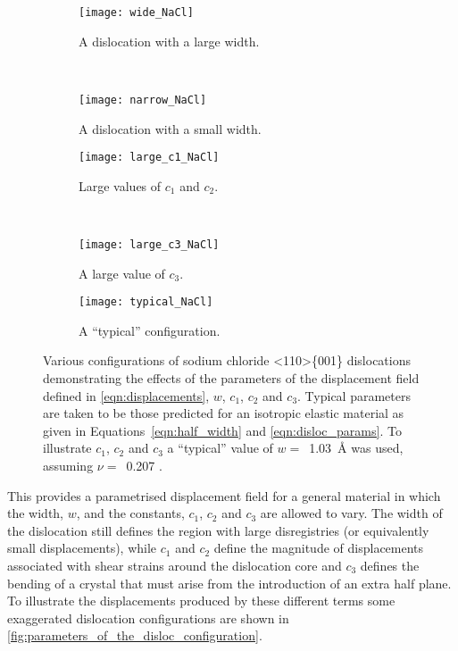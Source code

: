 \begin{figure}
\centering

    \begin{subfigure}{0.4\textwidth}
    \centering
    \texttt{[image: wide\_NaCl]}
    \caption{A dislocation with a large width.}
    \end{subfigure}
    ~
    \begin{subfigure}{0.4\textwidth}
    \centering
    \texttt{[image: narrow\_NaCl]}
    \caption{A dislocation with a small width.}
    \end{subfigure}

	\begin{subfigure}{0.4\textwidth}
	\centering
    \texttt{[image: large\_c1\_NaCl]}
    \caption{Large values of $c_1$ and $c_2$.}
	\end{subfigure}
    ~
	\begin{subfigure}{0.4\textwidth}
	\centering
    \texttt{[image: large\_c3\_NaCl]}
    \caption{A large value of $c_3$.}
	\end{subfigure}

    \begin{subfigure}{0.8\textwidth}
    \centering
    \texttt{[image: typical\_NaCl]}
    \caption{A ``typical'' configuration.}
    \end{subfigure}

\caption{Various configurations of sodium chloride <110>\{001\} dislocations demonstrating the effects of the parameters of the displacement field defined in \autoref{eqn:displacements}, $w$, $c_1$, $c_2$ and $c_3$. Typical parameters are taken to be those predicted for an isotropic elastic material as given in  Equations~\ref{eqn:half_width} and \ref{eqn:disloc_params}. To illustrate $c_1$, $c_2$ and $c_3$ a ``typical'' value of $w=$~\SI{1.03}{\angstrom} was used, assuming $\nu =$~\num{0.207} \cite{Theocaris1994}.\label{fig:parameters_of_the_disloc_configuration}}
\end{figure}


This provides a parametrised displacement field for a general material in which the width, $w$, and the constants, $c_1$, $c_2$ and $c_3$ are allowed to vary. The width of the dislocation still defines the region with large disregistries (or equivalently small displacements), while $c_1$ and $c_2$ define the magnitude of displacements associated with shear strains around the dislocation core and $c_3$ defines the bending of a crystal that must arise from the introduction of an extra half plane.
To illustrate the displacements produced by these different terms some exaggerated dislocation configurations are shown in \autoref{fig:parameters_of_the_disloc_configuration}.





